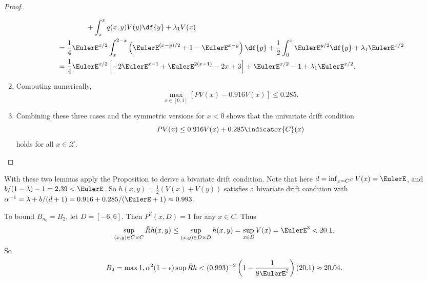 \documentclass[12pt]{article}
\begin{document}
\begin{example}
\begin{proof}
\begin{enumerate}
\begin{align*}
                    &\qquad \qquad + \int_x^x q(x,y) V(y) \df{y} +
                    \lambda_1 V(x) \\
                    &= \frac{1}{4} \EulerE^{x/2} \int_x^{2-x} \left(
                    \EulerE^{(x-y)/2} + 1 - \EulerE^{x-y} \right) \df{y}
                    + \frac{1}{2} \int_0^x \EulerE^{y/2} \df{y} +
                    \lambda_1 \EulerE^{x/2} \\
                    &= \frac{1}{4} \EulerE^{x/2} \left[ -2\EulerE^{x-1}
                    + \EulerE^{2(x-1)} - 2x + 3 \right] + \EulerE^{x/2}
                    - 1 + \lambda_1 \EulerE^{x/2}.
                \end{align*}
            \item
                Computing numerically,
                \[
                    \max_{x \in [0,1]}\left[ PV(x) - 0.916 V(x) \right]
                    \le 0.285.
                \]
            \item
                Combining these three cases and the symmetric versions
                for \( x < 0 \) shows that the univariate drift
                condition
                \[
                    PV(x) \le 0.916 V(x) + 0.285 \indicator{C}(x)
                \] holds for all \( x \in \mathcal{X} \).
        \end{enumerate}
    \end{proof}

    With these two lemmas apply the Proposition to derive a bivariate
    drift condition.  Note that here \( d = \inf_{x = C^C} V(x) =
    \EulerE \), and \( b/(1-\lambda) - 1 = 2.39 < \EulerE \).  So \( h(x,y)
    = \frac{1}{2}(V(x) + V(y)) \) satisfies a bivariate drift condition
    with \( \alpha^{-1} = \lambda + b/(d + 1) = 0.916 + 0.285/(\EulerE +
    1) \approx 0.993 \).

    To bound \( B_{n_0} = B_2 \), let \( D = [-6, 6] \).  Then \( P^2(x,D)
    = 1 \) for any \( x \in C \).  Thus
    \[
        \sup_{(x,y) \in C \times C} \bar{R} h(x,y) \le \sup_{(x,y) \in D
        \times D}h(x,y) = \sup_{x \in D} V(x) = \EulerE^3 < 20.1.
    \] So
    \[
        B_2 = \max{1, \alpha^2(1-\epsilon) \sup \bar{R} h} < (0.993)^{-2}
        \left(1 - \frac{1}{8 \EulerE^2} \right) (20.1) \approx 20.04.
    \]


\end{example}
\end{document}
